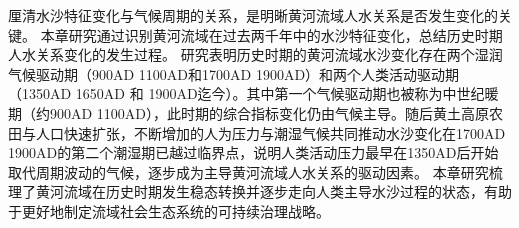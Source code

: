 厘清水沙特征变化与气候周期的关系，是明晰黄河流域人\textendash{}水关系是否发生变化的关键。
本章研究通过识别黄河流域在过去两千年中的水沙特征变化，总结历史时期人\textendash{}水关系变化的发生过程。
研究表明历史时期的黄河流域水沙变化存在两个湿润气候驱动期（900AD \textendash{} 1100AD和1700AD \textendash{} 1900AD）和两个人类活动驱动期（1350AD \textendash{} 1650AD 和 1900AD迄今）。其中第一个气候驱动期也被称为中世纪暖期（约900AD \textendash{} 1100AD），此时期的综合指标变化仍由气候主导。随后黄土高原农田与人口快速扩张，不断增加的人为压力与潮湿气候共同推动水沙变化在1700AD \textendash{} 1900AD的第二个潮湿期已越过临界点，说明人类活动压力最早在1350AD后开始取代周期波动的气候，逐步成为主导黄河流域人\textendash{}水关系的驱动因素。
本章研究梳理了黄河流域在历史时期发生稳态转换并逐步走向人类主导水沙过程的状态，有助于更好地制定流域社会\textendash{}生态系统的可持续治理战略。
